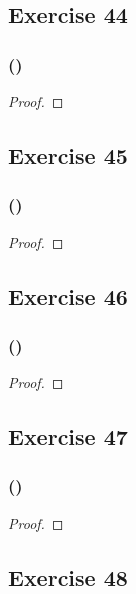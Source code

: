 \documentclass[14pt]{extarticle}
\begin{document}
\subsection{Exercise 44}

\subsubsection{()}

\begin{proof}

\end{proof}

\subsection{Exercise 45}

\subsubsection{()}

\begin{proof}

\end{proof}

\subsection{Exercise 46}

\subsubsection{()}

\begin{proof}

\end{proof}

\subsection{Exercise 47}

\subsubsection{()}

\begin{proof}

\end{proof}

\subsection{Exercise 48}
\end{document}
